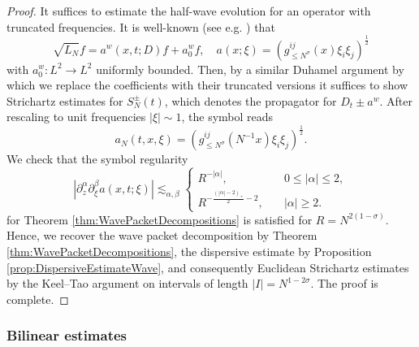 \documentclass{amsart}
\theoremstyle{definition}
\begin{document}
\begin{proof}
It suffices to estimate the half-wave evolution for an operator with truncated frequencies. It is well-known (see e.g. \cite[Theorem~3.3.1]{Sogge2017}) that
\begin{equation}
\label{eq:ApproximationPseudo}
\sqrt{L_N} f = a^w(x,t;D) f + a_0^w f, \quad a(x;\xi) = (g_{\leq N^{\sigma}}^{ij}(x) \xi_i \xi_j)^{\frac{1}{2}}
\end{equation}
with $a^w_0 : L^2 \to L^2$ uniformly bounded. Then, by a similar Duhamel argument by which we replace the coefficients with their truncated versions it suffices to show Strichartz estimates for $S^{\pm}_N(t)$, which denotes the propagator for $D_t \pm a^w$. 
After rescaling to unit frequencies $|\xi| \sim 1$, the symbol reads
\begin{equation*}
a_N(t,x,\xi) = ( g^{ij}_{\leq N^{\sigma}}(N^{-1} x) \xi_i \xi_j)^{\frac{1}{2}}.
\end{equation*}
We check that the symbol regularity
    \begin{equation*}
        |\partial_z^{\alpha} \partial_{\xi}^{\beta} a(x,t;\xi)| \lesssim_{\alpha,\beta} \begin{cases}
            R^{-|\alpha|}, &\quad 0 \leq |\alpha| \leq 2, \\
            R^{- \frac{(|\alpha|-2)_+}{2}-2}, &\quad |\alpha| \geq 2.
        \end{cases}
    \end{equation*}
for Theorem \ref{thm:WavePacketDecompositions} is satisfied for $R=N^{2(1-\sigma)}$. Hence, we recover the wave packet decomposition by Theorem \ref{thm:WavePacketDecompositions}, the dispersive estimate by Proposition \ref{prop:DispersiveEstimateWave}, and consequently Euclidean Strichartz estimates by the Keel--Tao argument \cite{KeelTao1998} on intervals of length $|I| = N^{1-2 \sigma}$. The proof is complete.
\end{proof}

\subsubsection{Bilinear estimates}
\end{document}
